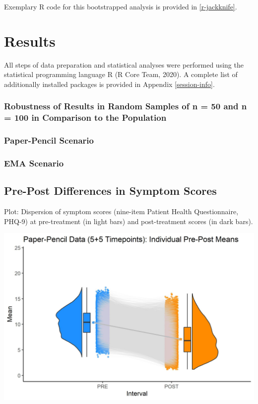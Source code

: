 \documentclass[12pt,twoside]{reedthesis}
\begin{document}
Exemplary R code for this bootstrapped analysis is provided in \ref{r-jackknife}.

\hypertarget{results}{%
\chapter{Results}\label{results}}

All steps of data preparation and statistical analyses were performed using the statistical programming language R (R Core Team, 2020). A complete list of additionally installed packages is provided in Appendix \ref{session-info}.

\hypertarget{robustness-of-results-in-random-samples-of-n-50-and-n-100-in-comparison-to-the-population}{%
\subsection{Robustness of Results in Random Samples of n = 50 and n = 100 in Comparison to the Population}\label{robustness-of-results-in-random-samples-of-n-50-and-n-100-in-comparison-to-the-population}}

\hypertarget{paper-pencil-scenario-1}{%
\subsection{Paper-Pencil Scenario}\label{paper-pencil-scenario-1}}

\hypertarget{ema-scenario-1}{%
\subsection{EMA Scenario}\label{ema-scenario-1}}

\hypertarget{pre-post-differences-in-symptom-scores}{%
\section{Pre-Post Differences in Symptom Scores}\label{pre-post-differences-in-symptom-scores}}

Plot: Dispersion of symptom scores (nine-item Patient Health Questionnaire, PHQ-9) at pre-treatment (in light bars) and post-treatment scores (in dark bars).
\begin{center}\includegraphics[width=0.75\linewidth]{data/Time Series Dataframes/k20_PP_5.5_Pre-Post_Box_Violin_Mean+CI} \end{center}
\end{document}
